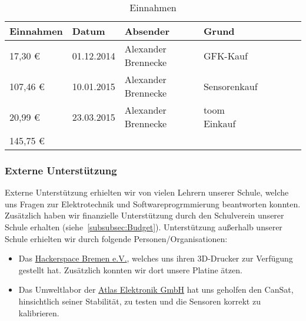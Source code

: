 \begin{table}[htbp]
  \centering
    \begin{tabular}{p{}p{}p{}p{}rrrl}
    \toprule
    \multicolumn{1}{c}{\textbf{Einnahmen}} & \textbf{Datum} & \textbf{Absender} & \textbf{Grund} \\
    \midrule
              17,30 \euro  & 01.12.2014 & Alexander Brennecke & GFK-Kauf \\
           107,46 \euro  & 10.01.2015 & Alexander Brennecke & Sensorenkauf \\
              20,99 \euro  & 23.03.2015 & Alexander Brennecke & toom Einkauf \\
    \bottomrule
    145,75 \euro & & & \\
    \bottomrule
    \end{tabular}%
	\caption{Einnahmen}
  \label{tab:budgeteinnahmen}%
\end{table}%

\subsubsection{Externe Unterstützung}
Externe Unterstützung erhielten wir von vielen Lehrern unserer Schule, welche uns Fragen zur Elektrotechnik und Softwareprogrmmierung beantworten konnten. Zusätzlich haben wir finanzielle Unterstützung durch den Schulverein unserer Schule erhalten (siehe~\ref{subsubsec:Budget}).
Unterstützung außerhalb unserer Schule erhielten wir durch folgende Personen/Organisationen:

\begin{itemize}
	\item Das \href{https://www.hackerspace-bremen.de/}{Hackerspace Bremen e.V.}, welches uns ihren 3D-Drucker zur Verfügung gestellt hat. Zusätzlich konnten wir dort unsere Platine ätzen.
	\begin{comment}
	\item \href{http://de.wikipedia.org/wiki/Martin_Schneider_(Nachrichtentechniker)} {Prof. Martin Schneider} von von dem Hochfrequenzlabor der Universität Bremen, welcher uns geholfen hat unsere Antenne an die Frequenz und die Wellenimpedanz anzupassen.
	\end{comment}
	\item  Das Umweltlabor der \href{http://www.atlas-elektronik.com/atlas-elektronik/}{Atlas Elektronik GmbH} hat uns geholfen den CanSat, hinsichtlich seiner Stabilität, zu testen und die Sensoren korrekt zu kalibrieren.
\end{itemize}